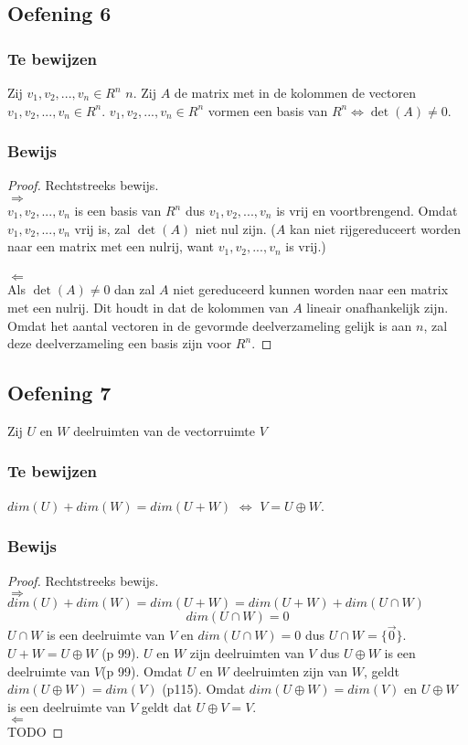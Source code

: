 \documentclass[lineaire_algebra_oplossingen.tex]{subfiles}
\begin{document}
\subsection{Oefening 6}
\subsubsection*{Te bewijzen}
Zij $v_1,v_2,...,v_n \in R^n$ $n$. Zij $A$ de matrix met in de kolommen de vectoren $v_1,v_2,...,v_n \in R^n$.
$v_1,v_2,...,v_n \in R^n$ vormen een basis van $R^n \Leftrightarrow \det(A) \neq 0$.
\subsubsection*{Bewijs}
\begin{proof}
Rechtstreeks bewijs.\\
\emph{$\Rightarrow$}\\
$v_1,v_2,...,v_n$ is een basis van $R^n$ dus $v_1,v_2,...,v_n$ is vrij en voortbrengend. Omdat $v_1,v_2,...,v_n$ vrij is, zal $\det(A)$ niet nul zijn. ($A$ kan niet rijgereduceert worden naar een matrix met een nulrij, want $v_1,v_2,...,v_n$ is vrij.)\\\\
\emph{$\Leftarrow$}\\
Als $\det(A) \neq 0$ dan zal $A$ niet gereduceerd kunnen worden naar een matrix met een nulrij. Dit houdt in dat de kolommen van $A$ lineair onafhankelijk zijn. Omdat het aantal vectoren in de gevormde deelverzameling gelijk is aan $n$, zal deze deelverzameling een basis zijn voor $R^n$.
\end{proof}

\subsection{Oefening 7}
Zij $U$ en $W$ deelruimten van de vectorruimte $V$
\subsubsection*{Te bewijzen}
$dim(U) + dim(W) = dim(U+W)$ $\Leftrightarrow$ $V = U \oplus W$.
\subsubsection*{Bewijs}
\begin{proof}
Rechtstreeks bewijs.\\
\emph{$\Rightarrow$}\\
$dim(U) + dim(W) = dim(U+W)= dim(U+W) + dim(U\cap W)$
\[
dim(U\cap W) = 0
\]
$U \cap W$ is een deelruimte van $V$ en $dim(U\cap W) = 0$ dus $U \cap W = \{\vec{0}\}$.
$U+W = U\oplus W$ (p 99). $U$ en $W$ zijn deelruimten van $V$ dus $U\oplus W$ is een deelruimte van $V$(p 99). Omdat $U$ en $W$ deelruimten zijn van $W$, geldt $dim(U \oplus W) = dim(V)$ (p115). Omdat $dim(U \oplus W) = dim(V)$ en $U \oplus W$ is een deelruimte van $V$ geldt dat $U \oplus V = V$.\\
\emph{$\Leftarrow$}\\
TODO
\end{proof}
\end{document}
